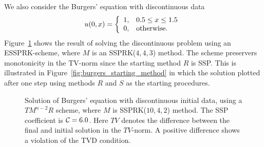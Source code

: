 We also consider the Burgers' equation with discontinuous data
\begin{equation}\label{eq:burgers_discont_IC}
    u(0,x)  = \left\{
                \begin{array}{ll}
                  1, & \hbox{$0.5 \leq x \leq 1.5$} \\
                  0, & \hbox{otherwise.}
                \end{array}
              \right.
\end{equation}
Figure~\ref{fig:burgers_discont} shows the result of solving the 
discontinuous problem using an ESSPRK-scheme, where $M$ is an 
SSPRK($4,4,3$) method. 
The scheme preservers monotonicity in the TV-norm since the starting 
method $R$ is SSP. 
This is illustrated in Figure~\ref{fig:burgers_starting_method} in which 
the solution plotted after one step using methods $R$ and $S$ as the 
starting procedures.

\begin{figure}[t!]
    \centering
    \caption{Solution of Burgers' equation with discontinuous initial data, using a 
    $TM^{n-2}R$ scheme, where $M$ is SSPRK($10,4,2$) method. 
    The SSP coefficient is $ \mathcal{C} = 6.0$.
    Here $TV$ denotes the difference between the final and initial solution in 
    the $TV$-norm. 
    A positive difference shows a violation of the TVD condition.}
    \label{fig:burgers_discont}
\end{figure}

